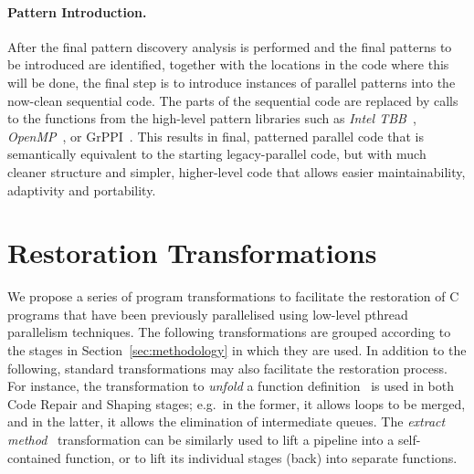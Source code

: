 \paragraph{Pattern Introduction.}
After the final pattern discovery analysis is performed and the final patterns to be introduced are identified, together with the locations in the code where this will be done, the final step is to introduce instances of parallel patterns into the now-clean sequential code.
The parts of the sequential code are replaced by calls to the functions from the high-level pattern libraries such as \emph{Intel TBB}~\cite{DBLP:reference/parallel/X11pz}, \emph{OpenMP}~\cite{10.1109/99.660313}, or GrPPI~\cite{DBLP:journals/concurrency/AstorgaD0G17}.
This results in final, patterned parallel code that is semantically equivalent to the starting legacy-parallel code, but with much cleaner structure and simpler, higher-level code that allows easier maintainability, adaptivity and portability.

\section{Restoration Transformations} \label{sec:refactoring}

We propose a series of program transformations to facilitate the restoration of C programs that have been previously parallelised using low-level pthread parallelism techniques. The following transformations are grouped according to the stages in Section~\ref{sec:methodology} in which they are used.
%
In addition to the following, standard transformations may also facilitate the restoration process. For instance, the transformation to \emph{unfold} a function definition~\cite{darlington77} is used in both Code Repair and Shaping stages; e.g.\ in the former, it allows loops to be merged, and in the latter, it allows the elimination of intermediate queues. The \emph{extract method}~\cite{DBLP:books/daglib/0019908} transformation can be similarly used to lift a pipeline into a self-contained function, or to lift its individual stages (back) into separate functions.


